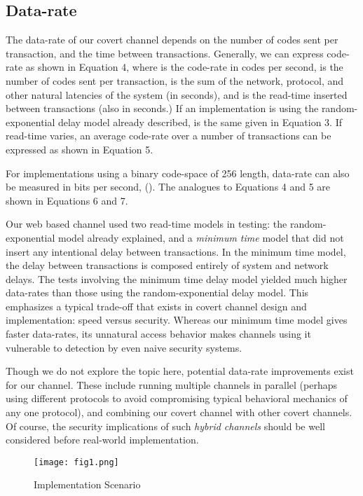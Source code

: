 \documentclass[10pt, conference]{IEEEtran}
\begin{document}
\subsection{Data-rate}
The data-rate of our covert channel depends on the number of codes sent per transaction, and the time between transactions.  Generally, we can express code-rate as shown in Equation 4, where  is the code-rate in codes per second,  is the number of codes sent per transaction,  is the sum of the network, protocol, and other natural latencies of the system (in seconds), and  is the read-time inserted between transactions (also in seconds.)  If an implementation is using the random-exponential delay model already described,  is the same given in Equation 3.  If read-time varies, an average code-rate over a number of transactions  can be expressed as shown in Equation 5.

For implementations using a binary code-space of 256 length, data-rate can also be measured in bits per second, ().  The  analogues to Equations 4 and 5 are shown in Equations 6 and 7.









Our web based channel used two read-time models in testing: the random-exponential model already explained, and a {\em minimum time} model that did not insert any intentional delay between transactions.  In the minimum time model, the delay between transactions is composed entirely of system and network delays.  The tests involving the minimum time delay model yielded much higher data-rates than those using the random-exponential delay model.  This emphasizes a typical trade-off that exists in covert channel design and implementation: speed versus security.  Whereas our minimum time model gives faster data-rates, its unnatural access behavior makes channels using it vulnerable to detection by even naive security systems.

Though we do not explore the topic here, potential data-rate improvements exist for our channel.  These include running multiple channels in parallel (perhaps using different protocols to avoid compromising typical behavioral mechanics of any one protocol), and combining our covert channel with other covert channels.  Of course, the security implications of such {\em hybrid channels} should be well considered before real-world implementation.

\begin{figure*}[ht]
  \centering
    \texttt{[image: fig1.png]}
  \caption{Implementation Scenario}
\end{figure*}
\end{document}
